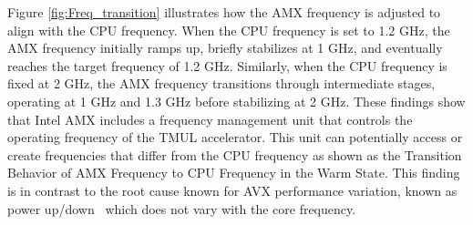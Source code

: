 Figure \ref{fig:Freq_transition} illustrates how the AMX frequency is adjusted to align with the CPU frequency. When the CPU frequency is set to 1.2 GHz, the AMX frequency initially ramps up, briefly stabilizes at 1 GHz, and eventually reaches the target frequency of 1.2 GHz. Similarly, when the CPU frequency is fixed at 2 GHz, the AMX frequency transitions through intermediate stages, operating at 1 GHz and 1.3 GHz before stabilizing at 2 GHz. 
These findings show that Intel AMX includes a frequency management unit that controls the operating frequency of the TMUL accelerator. This unit can potentially access or create frequencies that differ from the CPU frequency as shown as the Transition Behavior of AMX Frequency to CPU Frequency in the Warm State. 
This finding is in contrast to the root cause known for AVX performance variation, known as power up/down~\cite{netspectre} which does not vary with the core frequency.
